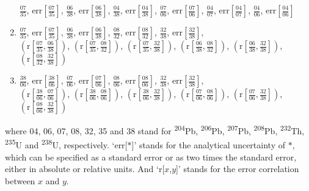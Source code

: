 \begin{refsection}
\begin{enumerate}
  $\frac{07}{35}$,  
  $\mbox{err}\!\left[\frac{07}{35}\right]$, 
  $\frac{06}{38}$,  
  $\mbox{err}\!\left[\frac{06}{38}\right]$,  
  $\frac{04}{38}$,  
  $\mbox{err}\!\left[\frac{04}{38}\right]$,  
  $\frac{07}{06}$,  
  $\mbox{err}\!\left[\frac{07}{06}\right]$, 
  $\frac{04}{07}$,  
  $\mbox{err}\!\left[\frac{04}{07}\right]$,  
  $\frac{04}{06}$,  
  $\mbox{err}\!\left[\frac{04}{06}\right]$
  \item 
  $\frac{07}{35}$,  
  $\mbox{err}\!\left[\frac{07}{35}\right]$, 
  $\frac{06}{38}$,  
  $\mbox{err}\!\left[\frac{06}{38}\right]$,  
  $\frac{08}{32}$,  
  $\mbox{err}\!\left[\frac{08}{32}\right]$,  
  $\frac{32}{38}$,  
  $\mbox{err}\!\left[\frac{32}{38}\right]$,  \\
  $\left(\mbox{r}\!\left[\frac{07}{35},\frac{06}{38}\right]\right)$,  
  $\left(\mbox{r}\!\left[\frac{07}{35},\frac{08}{32}\right]\right)$, 
  $\left(\mbox{r}\!\left[\frac{07}{35},\frac{32}{38}\right]\right)$,  
  $\left(\mbox{r}\!\left[\frac{06}{38},\frac{08}{32}\right]\right)$,  
  $\left(\mbox{r}\!\left[\frac{06}{38},\frac{32}{38}\right]\right)$, 
  $\left(\mbox{r}\!\left[\frac{08}{32},\frac{32}{38}\right]\right)$
  \item
  $\frac{38}{06}$,  
  $\mbox{err}\!\left[\frac{38}{06}\right]$, 
  $\frac{07}{06}$,  
  $\mbox{err}\!\left[\frac{07}{06}\right]$,  
  $\frac{08}{06}$,  
  $\mbox{err}\!\left[\frac{08}{06}\right]$,  
  $\frac{32}{38}$,  
  $\mbox{err}\!\left[\frac{32}{38}\right]$,  \\
  $\left(\mbox{r}\!\left[\frac{38}{06},\frac{07}{06}\right]\right)$,  
  $\left(\mbox{r}\!\left[\frac{38}{06},\frac{08}{06}\right]\right)$, 
  $\left(\mbox{r}\!\left[\frac{38}{06},\frac{32}{38}\right]\right)$,  
  $\left(\mbox{r}\!\left[\frac{07}{06},\frac{08}{06}\right]\right)$,  
  $\left(\mbox{r}\!\left[\frac{07}{06},\frac{32}{38}\right]\right)$, 
  $\left(\mbox{r}\!\left[\frac{08}{06},\frac{32}{38}\right]\right)$
\end{enumerate}

\noindent where 04, 06, 07, 08, 32, 35 and 38 stand for
\textsuperscript{204}Pb, \textsuperscript{206}Pb,
\textsuperscript{207}Pb, \textsuperscript{208}Pb,
\textsuperscript{232}Th, \textsuperscript{235}U and
\textsuperscript{238}U, respectively. `err[$\ast$]' stands for the
analytical uncertainty of $\ast$, which can be specified as a standard
error or as two times the standard error, either in absolute or
relative units. And `r[$x$,$y$]' stands for the error correlation
between $x$ and $y$.\\


\end{refsection}
